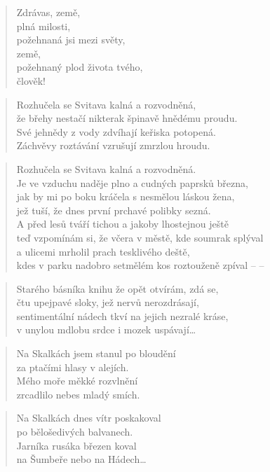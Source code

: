 \documentclass{book}
\begin{document}
\begin{verse}
Zdrávas, země,\\
plná milosti,\\
požehnaná jsi mezi světy,\\
země,\\
požehnaný plod života tvého,\\
člověk!
\end{verse}
\newpage
{}
\begin{verse}
Rozhučela se Svitava kalná a rozvodněná,\\
že břehy nestačí nikterak špinavě hnědému proudu.\\
Své jehnědy z vody zdvíhají keřiska potopená.\\
Záchvěvy roztávání vzrušují zmrzlou hroudu.
\end{verse}
\begin{verse}
Rozhučela se Svitava kalná a rozvodněná.\\
Je ve vzduchu naděje plno a cudných paprsků března,\\
jak by mi po boku kráčela s nesmělou láskou žena,\\
jež tuší, že dnes první prchavé polibky sezná.\\
A před lesů tváří tichou a jakoby lhostejnou ještě\\
teď vzpomínám si, že včera v městě, kde soumrak splýval\\
a ulicemi mrholil prach tesklivého deště,\\
kdes v parku nadobro setmělém kos roztouženě zpíval -- --
\end{verse}
\begin{verse}
Starého básníka knihu že opět otvírám, zdá se,\\
čtu upejpavé sloky, jež nervů nerozdrásají,\\
sentimentální nádech tkví na jejich nezralé kráse,\\
v unylou mdlobu srdce i mozek uspávají\ldots
\end{verse}
\newpage
{}
\begin{verse}
Na Skalkách jsem stanul po bloudění\\
za ptačími hlasy v alejích.\\
Mého moře měkké rozvlnění\\
zrcadlilo nebes mladý smích.
\end{verse}
\begin{verse}
Na Skalkách dnes vítr poskakoval\\
po bělošedivých balvanech.\\
Jarníka rusáka březen koval\\
na Šumbeře nebo na Hádech\ldots
\end{verse}
\end{document}
